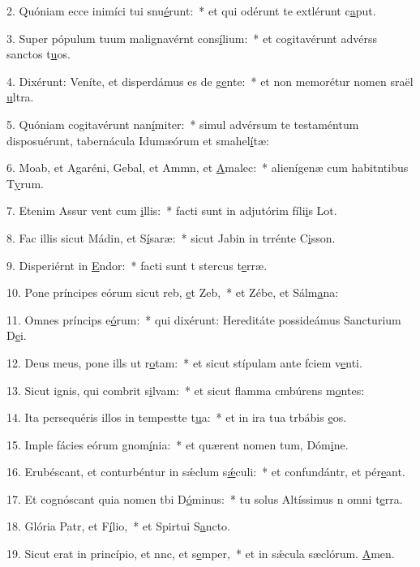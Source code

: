 2. Quóniam ecce inimíci tui snu\uline{é}runt:~* et qui odérunt te extlérunt c\uline{a}put.\par 
3. Super pópulum tuum malignavérnt cons\uline{í}lium:~* et cogitavérunt advérss sanctos t\uline{u}os.\par 
4. Dixérunt: Veníte, et disperdámus es de g\uline{e}nte:~* et non memorétur nomen sraël \uline{u}ltra.\par 
5. Quóniam cogitavérunt nan\uline{í}miter:~* simul advérsum te testaméntum disposuérunt, tabernácula Idumæórum et smahel\uline{í}tæ:\par 
6. Moab, et Agaréni, Gebal, et Ammn, et \uline{A}malec:~* alienígenæ cum habitntibus T\uline{y}rum.\par 
7. Etenim Assur vent cum \uline{i}llis:~* facti sunt in adjutórim fíli\uline{i}s Lot.\par 
8. Fac illis sicut Mádin, et S\uline{í}saræ:~* sicut Jabin in trrénte C\uline{i}sson.\par 
9. Disperiérnt in \uline{E}ndor:~* facti sunt t stercus t\uline{e}rræ.\par 
10. Pone príncipes eórum sicut reb, \uline{e}t Zeb,~* et Zébe, et Sálm\uline{a}na:\par 
11. Omnes príncips e\uline{ó}rum:~* qui dixérunt: Hereditáte possideámus Sancturium D\uline{e}i.\par 
12. Deus meus, pone ills ut r\uline{o}tam:~* et sicut stípulam ante fciem v\uline{e}nti.\par 
13. Sicut ignis, qui combrit s\uline{i}lvam:~* et sicut flamma cmbúrens m\uline{o}ntes:\par 
14. Ita persequéris illos in tempestte t\uline{u}a:~* et in ira tua trbábis \uline{e}os.\par 
15. Imple fácies eórum gnom\uline{í}nia:~* et quærent nomen tum, Dóm\uline{i}ne.\par 
16. Erubéscant, et conturbéntur in sǽclum s\uline{ǽ}culi:~* et confundántr, et pér\uline{e}ant.\par 
17. Et cognóscant quia nomen tbi D\uline{ó}minus:~* tu solus Altíssimus n omni t\uline{e}rra.\par 
18. Glória Patr, et F\uline{í}lio,~* et Spirtui S\uline{a}ncto.\par 
19. Sicut erat in princípio, et nnc, et s\uline{e}mper,~* et in sǽcula sæclórum. \uline{A}men.\par 
